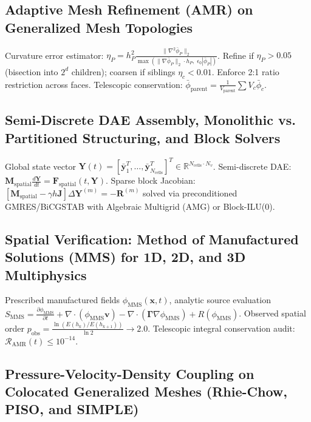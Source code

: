 \documentclass[11pt,a4paper]{article}
\begin{document}
\subsection{Adaptive Mesh Refinement (AMR) on Generalized Mesh Topologies}

Curvature error estimator: $\eta_P = h_P^2 \frac{\|\nabla^2 \bar{\phi}_P\|_2}{\max\left( \|\nabla \bar{\phi}_P\|_2 \cdot h_P, \; \epsilon_0 |\bar{\phi}_P| \right)}$.
Refine if $\eta_P > 0.05$ (bisection into $2^d$ children); coarsen if siblings $\eta_c < 0.01$. Enforce 2:1 ratio restriction across faces. Telescopic conservation: $\bar{\phi}_{\text{parent}} = \frac{1}{V_{\text{parent}}} \sum V_c \bar{\phi}_c$.

\subsection{Semi-Discrete DAE Assembly, Monolithic vs. Partitioned Structuring, and Block Solvers}

Global state vector $\mathbf{Y}(t) = [\bar{\mathbf{y}}_1^T, \dots, \bar{\mathbf{y}}_{N_{\text{cells}}}^T]^T \in \mathbb{R}^{N_{\text{cells}} \cdot N_v}$.
Semi-discrete DAE: $\mathbf{M}_{\text{spatial}} \frac{d\mathbf{Y}}{dt} = \mathbf{F}_{\text{spatial}}(t, \mathbf{Y})$.
Sparse block Jacobian: $\left[ \mathbf{M}_{\text{spatial}} - \gamma h \mathbf{J} \right] \Delta \mathbf{Y}^{(m)} = -\mathbf{R}^{(m)}$ solved via preconditioned GMRES/BiCGSTAB with Algebraic Multigrid (AMG) or Block-ILU(0).

\subsection{Spatial Verification: Method of Manufactured Solutions (MMS) for 1D, 2D, and 3D Multiphysics}

Prescribed manufactured fields $\phi_{\text{MMS}}(\mathbf{x}, t)$, analytic source evaluation $S_{\text{MMS}} = \frac{\partial \phi_{\text{MMS}}}{\partial t} + \nabla \cdot (\phi_{\text{MMS}} \mathbf{v}) - \nabla \cdot (\boldsymbol{\Gamma} \nabla \phi_{\text{MMS}}) + R(\phi_{\text{MMS}})$.
Observed spatial order $p_{\text{obs}} = \frac{\ln(E(h_k)/E(h_{k+1}))}{\ln 2} \to 2.0$. Telescopic integral conservation audit: $\mathcal{R}_{\text{AMR}}(t) \le 10^{-14}$.




\subsection{Pressure-Velocity-Density Coupling on Colocated Generalized Meshes (Rhie-Chow, PISO, and SIMPLE)}
\end{document}
